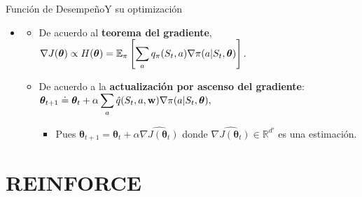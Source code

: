 \documentclass[10pt, envcountsect, handout, aspectratio=1610, hyperref={hypertexnames=true}]{beamer}
\begin{document}
\begin{frame}{Función de Desempeño}{Y su optimización}
\begin{itemize}
		\begin{itemize}
			\item Es un valor esperado respecto de $\mu(s)$. Podemos hacer muestreo.
		\end{itemize}		
		
		\item  {}
		\begin{itemize}
		
		\item  De acuerdo al \textbf{teorema del gradiente}, $\nabla J(\bm{\theta}) \propto \displaystyle H(\bm{\theta}) = \mathbb{E}_\pi \left[ \sum_a q_{\pi}(S_t, a) \nabla \pi(a|S_t, \bm{\theta}) \right].$
		
		\item De acuerdo a la \textbf{actualización por ascenso del gradiente}:
		{$\displaystyle
			\bm{\theta}_{t+1} \doteq \bm{\theta}_t + \alpha \sum_a  \hat{q}(S_t, a, \mathbf{w}) \nabla \pi(a|S_t, \bm{\theta}),
			$}			
			\begin{itemize}
				\item Pues {$
					\bm{\theta}_{t+1} = \bm{\theta}_t + \alpha \widehat{\nabla J(\bm{\theta}_t)}
					$  \qquad donde $\widehat{\nabla J(\bm{\theta}_t)} \in \mathbb{R}^{d'}$ es una estimación.}
			\end{itemize}
		\end{itemize}
			
			
	\end{itemize}
\end{frame}



\section{REINFORCE}
\end{document}
